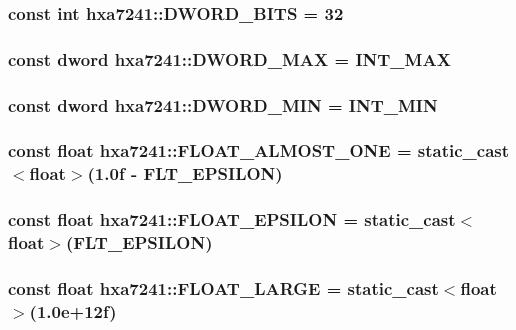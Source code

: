 \subsubsection{\setlength{\rightskip}{0pt plus 5cm}const int {\bf hxa7241::DWORD\_\-BITS} = 32}\label{namespacehxa7241_98add39fa8e129dce90bd4d5b713654d}


\subsubsection{\setlength{\rightskip}{0pt plus 5cm}const {\bf dword} {\bf hxa7241::DWORD\_\-MAX} = INT\_\-MAX}\label{namespacehxa7241_695c61218401c8b2037d44df891197de}


\subsubsection{\setlength{\rightskip}{0pt plus 5cm}const {\bf dword} {\bf hxa7241::DWORD\_\-MIN} = INT\_\-MIN}\label{namespacehxa7241_6812ba25c03cea3ac61c640bb57189a6}


\subsubsection{\setlength{\rightskip}{0pt plus 5cm}const float {\bf hxa7241::FLOAT\_\-ALMOST\_\-ONE} = static\_\-cast$<$float$>$(1.0f - FLT\_\-EPSILON)}\label{namespacehxa7241_2b4e780116de88f676fb1cf7baa8547f}


\subsubsection{\setlength{\rightskip}{0pt plus 5cm}const float {\bf hxa7241::FLOAT\_\-EPSILON} = static\_\-cast$<$float$>$(FLT\_\-EPSILON)}\label{namespacehxa7241_1c1abb83af1eaa2c69272cf6cca3bb0a}


\subsubsection{\setlength{\rightskip}{0pt plus 5cm}const float {\bf hxa7241::FLOAT\_\-LARGE} = static\_\-cast$<$float$>$(1.0e+12f)}\label{namespacehxa7241_3e7fc9606463c22343f046d0befb25f6}


